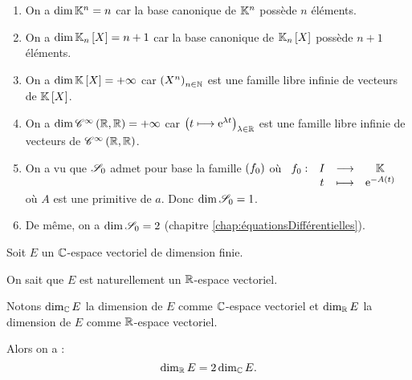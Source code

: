 \begin{corr}
\begin{enumerate}
\item On a \(\dim\mathbb{K}^n=n\) car la base canonique de \(\mathbb{K}^n\) possède \(n\) éléments. \\

\item On a \(\dim\polydeg{n}=n+1\) car la base canonique de \(\polydeg{n}\) possède \(n+1\) éléments. \\

\item On a \(\dim\poly=\pinf\) car \(\left(X^n\right)_{n\in\mathbb{N}}\) est une famille libre infinie de vecteurs de \(\poly\). \\

\item On a \(\dim\mathscr{C}^{\infty}\left(\mathbb{R},\mathbb{R}\right)=+\infty\) car \(\left(t\longmapsto\mathrm{e}^{\lambda t}\right)_{\lambda\in\mathbb{R}}\) est une famille libre infinie de vecteurs de \(\mathscr{C}^{\infty}\left(\mathbb{R},\mathbb{R}\right)\). \\

\item On a vu que \(\mathscr{S}_0\) admet pour base la famille \(\left(f_0\right)\) où \(\begin{array}[t]{cccc}f_0 : & I & \longrightarrow & \mathbb{K} \\ & t & \longmapsto & \mathrm{e}^{-A\left(t\right)}\end{array}\) où \(A\) est une primitive de \(a\). Donc \(\dim\mathscr{S}_0=1\). \\

\item De même, on a \(\dim\mathscr{S}_0=2\) (\cf chapitre \ref{chap:équationsDifférentielles}).
\end{enumerate}
\end{corr}

\begin{prop}
Soit \(E\) un \(\mathbb{C}\)-espace vectoriel de dimension finie.

On sait que \(E\) est naturellement un \(\mathbb{R}\)-espace vectoriel.

Notons \(\dim_{\mathbb{C}} E\) la dimension de \(E\) comme \(\mathbb{C}\)-espace vectoriel et \(\dim_{\mathbb{R}} E\) la dimension de \(E\) comme \(\mathbb{R}\)-espace vectoriel.

Alors on a : \[\dim_{\mathbb{R}} E=2\dim_{\mathbb{C}} E.\]
\end{prop}

